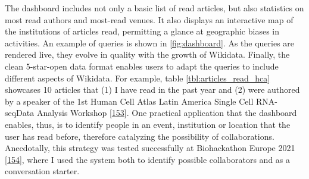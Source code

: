 The dashboard includes not only a basic list of read articles, but also statistics on most read authors and most-read venues.
It also displays an interactive map of the institutions of articles read, permitting a glance at geographic biases in activities.
An example of queries is shown in \ref{fig:dashboard}.
As the queries are rendered live, they evolve in quality with the growth of Wikidata.
Finally, the clean 5-star-open data format enables users to adapt the queries to include different aspects of Wikidata.
For example, table \ref{tbl:articles_read_hca} showcases 10 articles that (1) I have read in the past year and (2) were authored by a speaker of the 1st Human Cell Atlas Latin America Single Cell RNA-seqData Analysis Workshop {[}\protect\hyperlink{ref-1hag8XE6}{153}{]}.
One practical application that the dashboard enables, thus, is to identify people in an event, institution or location that the user has read before, therefore catalyzing the possibility of collaborations.
Anecdotally, this strategy was tested successfully at Biohackathon Europe 2021 {[}\protect\hyperlink{ref-kHL3NVxk}{154}{]}, where I used the system both to identify possible collaborators and as a conversation starter.

